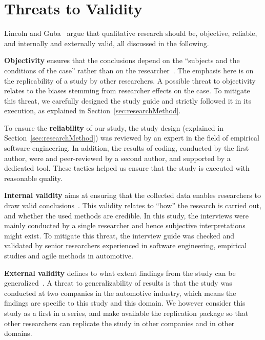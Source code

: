 \documentclass[sigconf]{acmart}
\begin{document}
\maketitle







\section{Threats to Validity}\label{sec:threatsToValidity}
Lincoln and Guba~\cite{Lincoln1985} argue that qualitative research should be, objective, reliable, and internally and externally valid, all discussed in the following.%

{\bf Objectivity} ensures that the conclusions depend on the ``subjects and the conditions of the case'' rather than on the researcher~\cite{Miles}. The emphasis here is on the replicability of a study by other researchers. A possible threat to objectivity relates to the biases stemming from researcher effects on the case. To mitigate this threat, we carefully designed the study guide and strictly followed it in its execution, as explained in Section~\ref{sec:researchMethod}. 

To ensure the {\bf reliability} of our study, the study design (explained in Section~\ref{sec:researchMethod}) was reviewed by an expert in the field of empirical software engineering. In addition, the results of coding, conducted by the first author, were and peer-reviewed by a second author, and supported by a dedicated tool. These tactics helped us ensure that the study is executed with reasonable quality.

\textbf{Internal validity} aims at ensuring that the collected data enables researchers to draw valid conclusions~\cite{Creswell2003}. This validity relates to ``how'' the research is carried out, and whether the used methods are credible. In this study, the interviews were mainly conducted by a single researcher and hence subjective interpretations might exist. To mitigate this threat, the interview guide was checked and validated by senior researchers experienced in software engineering, empirical studies and agile methods in automotive.

\textbf{External validity} defines to what extent findings from the study can be generalized~\cite{Creswell2003}. A threat to generalizability of results is that the study was conducted at two companies in the automotive industry, which means the findings are specific to this study and this domain. We however consider this study as a first in a series, and make available the replication package so that other researchers can replicate the study in other companies and in other domains.



%


\balance



\end{document}
